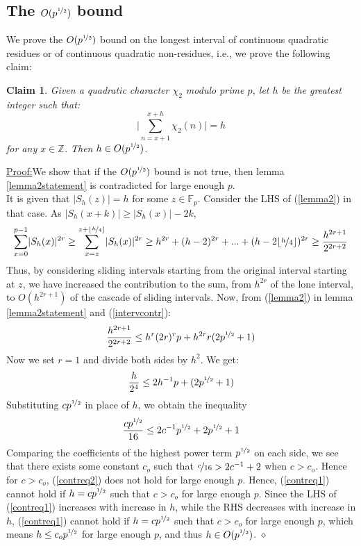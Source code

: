 \documentclass{report}
\newtheorem*{claim*}{Claim}
\newenvironment{claimproof}[1]{\vspace{2.5mm}\par\noindent\underline{Proof:}\space#1}{\hfill $\diamond$ \vspace{2.5mm} \par}
\begin{document}
\subsection*{The $O(p^{\nicefrac{1}{2}})$ bound}
We prove the $O(p^{\nicefrac{1}{2}})$ bound on the longest interval of continuous quadratic residues or of continuous quadratic non-residues, i.e., we prove the following claim:
\begin{claim*}
Given a quadratic character $\chi_2$ modulo prime $p$, let $h$ be the greatest integer such that:
\[\bigg\lvert\sum\limits_{n=x+1}^{x+h}\chi_2(n)\bigg\rvert=h\]
 for any $x\in\mathbb{Z}$. Then $h\in O(p^{\nicefrac{1}{2}})$.
\end{claim*}
\begin{claimproof}
We show that if the $O(p^{\nicefrac{1}{2}})$ bound is not true, then lemma \ref{lemma2statement} is contradicted for large enough $p$.\\
It is given that $\lvert S_h(z)\rvert=h$ for some $z\in \mathbb{F}_p$. Consider the LHS of (\ref{lemma2}) in that case. As $\lvert S_h(x+k)\rvert \geq \lvert S_h(x)\rvert-2k$,
\begin{equation} \label{intervcontr}
\sum\limits_{x=0}^{p-1}\lvert S_h(x)\rvert^{2r}\geq\sum\limits_{x=z}^{z+\lfloor\nicefrac{h}{4}\rfloor}\lvert S_h(x)\rvert^{2r} \geq h^{2r}+(h-2)^{2r}+...+(h-2\lfloor\nicefrac{h}{4}\rfloor)^{2r} \geq \frac{h^{2r+1}}{2^{2r+2}}
\end{equation}
Thus, by considering sliding intervals starting from the original interval starting at $z$, we have increased the contribution to the sum, from $h^{2r}$ of the lone interval, to $O(h^{2r+1})$ of the cascade of sliding intervals. Now, from (\ref{lemma2}) in lemma \ref{lemma2statement} and (\ref{intervcontr}):
$$ \frac{h^{2r+1}}{2^{2r+2}} \leq h^{r}(2r)^{r}p+h^{2r}r(2p^{\nicefrac{1}{2}}+1)$$
Now we set $r=1$ and divide both sides by $h^{2}$. We get:
\begin{equation} \label{contreq1}
\frac{h}{2^{4}} \leq 2h^{-1}p+(2p^{\nicefrac{1}{2}}+1)
\end{equation}
Substituting $cp^{\nicefrac{1}{2}}$ in place of $h$, we obtain the inequality
\begin{equation} \label{contreq2}
\frac{cp^{\nicefrac{1}{2}}}{16} \leq 2c^{-1}p^{\nicefrac{1}{2}}+2p^{\nicefrac{1}{2}}+1
\end{equation}
Comparing the coefficients of the highest power term $p^{\nicefrac{1}{2}}$ on each side, we see that there exists some constant $c_o$ such that $\nicefrac{c}{16}>2c^{-1}+2$ when $c>c_o$. Hence for $c>c_o$, (\ref{contreq2}) does not hold for large enough $p$. Hence, (\ref{contreq1}) cannot hold if $h=cp^{\nicefrac{1}{2}}$ such that $c>c_o$ for large enough $p$. Since the LHS of (\ref{contreq1}) increases with increase in $h$, while the RHS decreases with increase in $h$, (\ref{contreq1}) cannot hold if $h=cp^{\nicefrac{1}{2}}$ such that $c>c_o$ for large enough $p$, which means $h\leq c_op^{\nicefrac{1}{2}}$ for large enough $p$, and thus $h\in O(p^{\nicefrac{1}{2}})$.
\end{claimproof}
%
%
\end{document}
